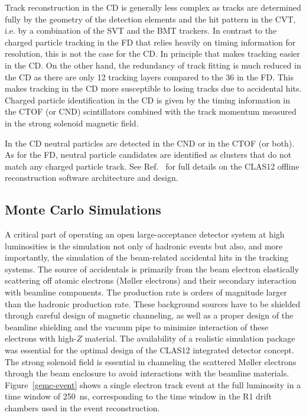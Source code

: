 \documentclass[final,3p,twocolumn]{elsarticle}
\begin{document}
Track reconstruction in the CD is generally less complex as tracks are determined fully by the geometry of the 
detection elements and the hit pattern in the CVT, i.e. by a combination of the SVT and the BMT trackers.  In
contrast to the charged particle tracking in the FD that relies heavily on timing information for resolution, this
is not the case for the CD. In principle that makes tracking easier in the CD. On the other hand, the redundancy
of track fitting is much reduced in the CD as there are only 12 tracking layers compared to the 36 in the FD. This
makes tracking in the CD more susceptible to losing tracks due to accidental hits. Charged particle identification
in the CD is given by the timing information in the CTOF (or CND) scintillators combined with the track momentum
measured in the strong solenoid magnetic field.

In the CD neutral particles are detected in the CND or in the CTOF (or both). As for the FD, neutral particle
candidates are identified as clusters that do not match any charged particle track. See Ref.~\cite{Software} for
full details on the CLAS12 offline reconstruction software architecture and design.


\subsection{Monte Carlo Simulations} 

A critical part of operating an open large-acceptance detector system at high luminosities is the simulation not
only of hadronic events but also, and more importantly, the simulation of the beam-related accidental hits in the
tracking systems. The source of accidentals is primarily from the beam electron elastically scattering off atomic
electrons (M{\o}ller electrons) and their secondary interaction with beamline components. The production rate
is orders of magnitude larger than the hadronic production rate. These background sources have to be shielded
through careful design of magnetic channeling, as well as a proper design of the beamline shielding and the vacuum
pipe to minimize interaction of these electrons with high-$Z$ material. The availability of a realistic simulation
package was essential for the optimal design of the CLAS12 integrated detector concept. The strong solenoid
field is essential in channeling the scattered M{\o}ller electrons through the beam enclosure to avoid interactions
with the beamline materials. Figure~\ref{gemc-event} shows a single electron track event at the full
luminosity in a time window of 250~ns, corresponding to the time window in the R1 drift chambers used in the event 
reconstruction. 
\end{document}
